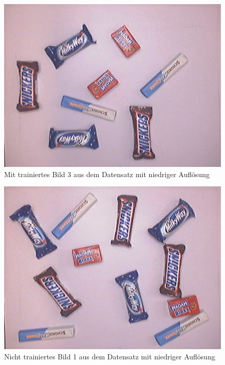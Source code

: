     \begin{figure}[H]
        \centering
        \includegraphics[angle = 90, width = \textwidth]{Bilder/models/model_comparison/images-to-detect/trained_3.jpg}
        \caption{Mit trainiertes Bild 3 aus dem Datensatz mit niedriger Auflösung}
    \end{figure}
    
    \begin{figure}[H]
        \centering
        \includegraphics[angle = 90, width = \textwidth]{Bilder/models/model_comparison/images-to-detect/non_trained_1.jpg}
        \caption{Nicht trainiertes Bild 1 aus dem Datensatz mit niedriger Auflösung}
    \end{figure}
    
